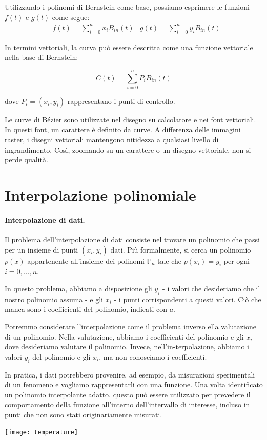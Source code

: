 \documentclass{article}
\begin{document}
Utilizzando i polinomi di Bernstein come base, possiamo esprimere le funzioni
\( f(t) \) e \( g(t) \) come segue:
\begin{equation*}
    \begin{aligned}
        &f(t)=\displaystyle\sum_{i=0}^{n}x_iB_{in}(t)
        &g(t)=\displaystyle\sum_{i=0}^{n} y_iB_{in}(t) 
    \end{aligned} 
\end{equation*}

In termini vettoriali, la curva può essere descritta come una funzione
vettoriale nella base di Bernstein:

$$C(t) = \sum_{i=0}^{n} P_i B_{in}(t)$$

dove \(P_i = (x_i, y_i)\) rappresentano i punti di controllo.

Le curve di Bézier sono utilizzate nel disegno su calcolatore e nei font
vettoriali. In questi font, un carattere è definito da curve. A differenza
delle immagini raster, i disegni vettoriali mantengono nitidezza a qualsiasi
livello di ingrandimento. Così, zoomando su un carattere o un disegno
vettoriale, non si perde qualità.
\newpage
\section{Interpolazione polinomiale}
\paragraph{Interpolazione di dati.} Il problema dell'interpolazione di dati
consiste nel trovare un polinomio che passi per un insieme di punti $(x_i,
y_i)$ dati. Più formalmente, si cerca un polinomio $p(x)$ appartenente
all'insieme dei polinomi $\mathbb{P}_n$ tale che $p(x_i)=y_i$ per ogni
$i=0,\ldots,n$.

In questo problema, abbiamo a disposizione gli $y_i$ - i valori che
desideriamo che il nostro polinomio assuma -  e gli $x_i$ - i punti
corrispondenti a questi valori. Ciò che manca sono i coefficienti del
polinomio, indicati con $a$.

Potremmo considerare l'interpolazione come il problema inverso ella
valutazione di un polinomio. Nella valutazione, abbiamo i coefficienti del
polinomio e gli $x_i$ dove desideriamo valutare il polinomio. Invece,
nell'in-terpolazione, abbiamo i valori $y_i$ del polinomio e gli $x_i$, ma non
conosciamo i coefficienti.

In pratica, i dati potrebbero provenire, ad esempio, da misurazioni
sperimentali di un fenomeno e vogliamo rappresentarli con una funzione. Una
volta identificato un polinomio interpolante adatto, questo può essere
utilizzato per prevedere il comportamento della funzione all'interno
dell'intervallo di interesse, incluso in punti che non sono stati
originariamente misurati.
\begin{center}
    \texttt{[image: temperature]}
\end{center}
\end{document}
